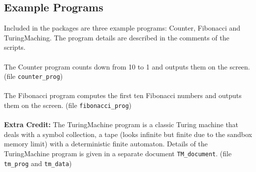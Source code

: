 \documentclass[11pt]{article}
\begin{document}
\subsection{Example Programs}
Included in the packages are three example programs: Counter, Fibonacci and TuringMaching. The program details are described in the comments of the scripts.\\\\
The Counter program counts down from 10 to 1 and outputs them on the screen. (file {\tt counter\_prog})\\\\
The Fibonacci program computes the first ten Fibonacci numbers and outputs them on the screen. (file {\tt fibonacci\_prog})\\\\
{\bf Extra Credit:} The TuringMachine program is a classic Turing machine that deals with a symbol collection, a tape (looks infinite but finite due to the sandbox memory limit) with a deterministic finite automaton. Details of the TuringMachine program is given in a separate document {\tt TM\_document}. (file {\tt tm\_prog} and {\tt tm\_data})
\end{document}
